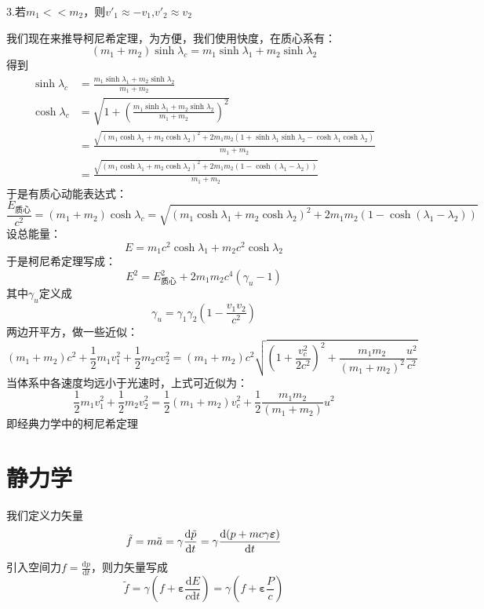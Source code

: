 \documentclass[utf8]{ctexart}
\begin{document}
3.若$m_1<<m_2$，则$v'_1\approx-v_1$,$v'_2\approx v_2$

我们现在来推导柯尼希定理，为方便，我们使用快度，在质心系有：
\[(m_1+m_2)\sinh{\lambda_c}=m_1\sinh{\lambda_1}+m_2\sinh{\lambda_2}\]
得到
\begin{equation*}
    \begin{split}
    \sinh{\lambda_c}&=\frac{m_1\sinh{\lambda_1}+m_2\sinh{\lambda_2}}{m_1+m_2}\\
    \cosh{\lambda_c}&=\sqrt{1+(\frac{m_1\sinh{\lambda_1}+m_2\sinh{\lambda_2}}{m_1+m_2})^2}\\
    &=\frac{\sqrt{(m_1\cosh{\lambda_1}+m_2\cosh{\lambda_2})^2+2m_1m_2(1+\sinh{\lambda_1}\sinh{\lambda_2}-\cosh{\lambda_1}\cosh{\lambda_2})}}{m_1+m_2}\\&=\frac{\sqrt{(m_1\cosh{\lambda_1}+m_2\cosh{\lambda_2})^2+2m_1m_2(1-\cosh{(\lambda_1-\lambda_2)})}}{m_1+m_2}
    \end{split}
\end{equation*}
于是有质心动能表达式：
\[\frac{E_\text{质心}}{c^2}=(m_1+m_2)\cosh{\lambda_c}=\sqrt{(m_1\cosh{\lambda_1}+m_2\cosh{\lambda_2})^2+2m_1m_2(1-\cosh{(\lambda_1-\lambda_2)})}\]
设总能量：
\[E=m_1c^2\cosh{\lambda_1}+m_2c^2\cosh{\lambda_2}\]
于是柯尼希定理写成：
\[E^2=E^2_\text{质心}+2m_1m_2c^4(\gamma_u-1)\]
其中$\gamma_u$定义成
\[\gamma_u=\gamma_1 \gamma_2(1-\frac{v_1 v_2}{c^2})\]
两边开平方，做一些近似：
\[(m_1+m_2)c^2+\frac12 m_1v^2_1+\frac12 m_2cv^2_2=(m_1+m_2)c^2\sqrt{(1+\frac{v^2_c}{2c^2})^2+\frac{m_1m_2}{(m_1+m_2)^2}\frac{u^2}{c^2}}\]
当体系中各速度均远小于光速时，上式可近似为：
\[\frac12 m_1v^2_1+\frac12 m_2v^2_2=\frac12 (m_1+m_2)v^2_c+\frac12 \frac{m_1m_2}{(m_1+m_2)}u^2\]
即经典力学中的柯尼希定理

\section{静力学}
我们定义力矢量\[\tilde{f}=m\tilde{a}=\gamma\frac{\mathrm{d}\Tilde{p}}{\mathrm{d}t}=\gamma\frac{\mathrm{d}(p+mc\gamma{\boldsymbol{\varepsilon}})}{\mathrm{d}t}\]
引入空间力$f=\frac{\mathrm{d}p}{\mathrm{d}t}$，则力矢量写成\[\tilde{f}=\gamma(f+{\boldsymbol{\varepsilon}}\frac{\mathrm{d}E}{c\mathrm{d}t})=\gamma(f+{\boldsymbol{\varepsilon}}\frac{P}{c})\]
\end{document}
